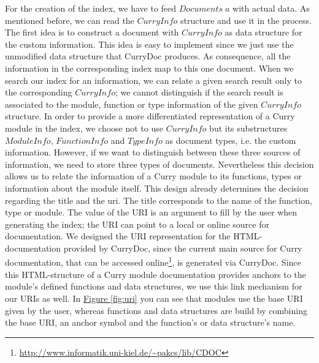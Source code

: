 \documentclass[%
	pdftex,%
	a4paper,%
	oneside,%
	chapterprefix,%
	headsepline,%
	12pt%
]{scrbook}
\newcommand{\Conid}[1]{\mathit{#1}}
\newcommand{\Varid}[1]{\mathit{#1}}
\begin{document}
For the creation of the index, we have to feed \ensuremath{\Conid{Documents}\;\Varid{a}} with
actual data. As mentioned before, we can read the \ensuremath{\Conid{CurryInfo}}
structure and use it in the process. The first idea is to construct a
document with \ensuremath{\Conid{CurryInfo}} as data structure for the custom
information. This idea is easy to implement since we just use the
unmodified data structure that CurryDoc produces. As consequence, all
the information in the corresponding index map to this one
document. When we search our index for an information, we can relate a
given search result only to the corresponding \ensuremath{\Conid{CurryInfo}}; we cannot
distinguish if the search result is associated to the module, function
or type information of the given \ensuremath{\Conid{CurryInfo}} structure. In order to
provide a more differentiated representation of a Curry module in the
index, we choose not to use \ensuremath{\Conid{CurryInfo}} but its substructures
\ensuremath{\Conid{ModuleInfo}}, \ensuremath{\Conid{FunctionInfo}} and \ensuremath{\Conid{TypeInfo}} as document types,
i.e. the custom information. However, if we want to distinguish
between these three sources of information, we need to store three
types of documents. Nevertheless this decision allows us to relate the
information of a Curry module to its functions, types or information
about the module itself. This design already determines the decision
regarding the title and the uri. The title corresponds to the name of
the function, type or module. The value of the URI is an argument to
fill by the user when generating the index; the URI can point to a
local or online source for documentation. We designed the URI
representation for the HTML-documentation provided by CurryDoc, since
the current main source for Curry documentation, that can be accessed
online\footnote{\url{http://www.informatik.uni-kiel.de/~pakcs/lib/CDOC}},
is generated via CurryDoc. Since this HTML-structure of a Curry module
documentation provides anchors to the module's defined functions and
data structures, we use this link mechanism for our URIs as well. In
\hyperref[fig:uri]{Figure \ref{fig:uri}} you can see that modules use
the base URI given by the user, whereas functions and data structures
are build by combining the base URI, an anchor symbol and the
function's or data structure's name.\\
\end{document}
